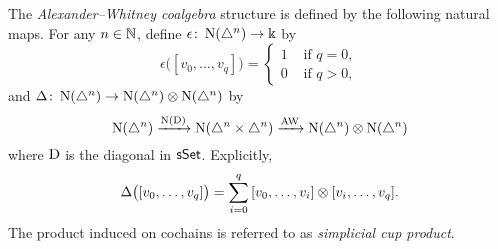 The \textit{Alexander--Whitney coalgebra} structure is defined by the following natural maps.
For any $n \in \mathbb{N}$, define $\epsilon \colon \operatorname{N}(\triangle^n) \to \Bbbk$ by
\[
\epsilon \big( [v_0, \dots, v_q] \big) = \begin{cases} 1 & \text{ if } q = 0, \\ 0 & \text{ if } q>0, \end{cases}
\]
and $\Delta \colon \operatorname{N}(\triangle^n) \to \operatorname{N}(\triangle^n) \otimes \operatorname{N}(\triangle^n)$ by
\[
\operatorname{N}(\triangle^n) \xrightarrow{\operatorname{N}(\operatorname{D})} \operatorname{N}(\triangle^n \times \triangle^n) \xrightarrow{\operatorname{AW}} \operatorname{N}(\triangle^n) \otimes \operatorname{N}(\triangle^n)
\]
where $\operatorname{D}$ is the diagonal in $\mathsf{sSet}$.
Explicitly,
\[
\Delta \big( [v_0, \dots, v_q] \big) =
\sum_{i=0}^q \, [v_0, \dots, v_i] \otimes [v_i, \dots, v_q].
\]
The product induced on cochains is referred to as \textit{simplicial cup product}.
